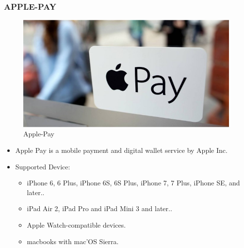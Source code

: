 \documentclass[handout]{beamer}
\begin{document}

\begin{frame}
\frametitle{APPLE-PAY}

\begin{figure}[h]
\begin{center}
\includegraphics[scale=0.2,angle=360]{apple1.jpg}
\caption{Apple-Pay}
\end{center}
\end{figure}
\begin{itemize}
\item Apple Pay is a mobile payment and digital wallet service by Apple Inc. 
\item Supported Device:
           \begin{itemize}
	       \item iPhone 6, 6 Plus, iPhone 6S, 6S Plus, iPhone 7, 7 Plus, iPhone SE, and later.. 
           \item iPad Air 2, iPad Pro and iPad Mini 3 and later..
           \item  Apple Watch-compatible devices.
           \item macbooks with mac'OS Sierra.
           \end{itemize}
\end{itemize}       



\end{frame}
\end{document}
